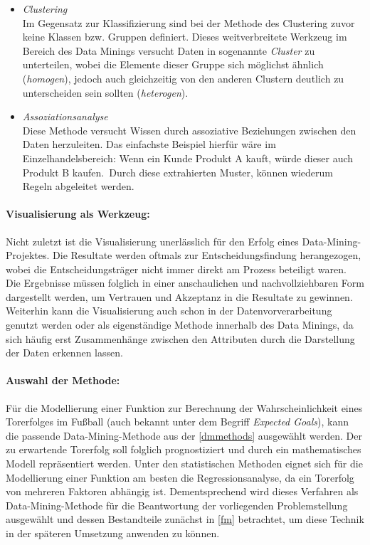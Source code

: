 \begin{itemize}
\item \textit{Clustering}
\\ Im Gegensatz zur Klassifizierung sind bei der Methode des Clustering zuvor keine Klassen bzw. Gruppen definiert. Dieses weitverbreitete Werkzeug im Bereich des Data Minings versucht Daten in sogenannte \textit{Cluster} zu unterteilen, wobei die Elemente dieser Gruppe sich möglichst ähnlich (\textit{homogen}), jedoch auch gleichzeitig von den anderen Clustern deutlich zu unterscheiden sein sollten (\textit{heterogen}).
\enlargethispage{\baselineskip} 
\item \textit{Assoziationsanalyse}
\\ Diese Methode versucht Wissen durch assoziative Beziehungen zwischen den Daten herzuleiten. Das einfachste Beispiel hierfür wäre im Einzelhandelsbereich: \glqq Wenn ein Kunde Produkt A kauft, würde dieser auch Produkt B kaufen.\grqq~Durch diese extrahierten Muster, können wiederum Regeln abgeleitet werden.
\end{itemize}


\paragraph{Visualisierung als Werkzeug:}
Nicht zuletzt ist die Visualisierung unerlässlich für den Erfolg eines Data-Mining-Projektes. Die Resultate werden oftmals zur Entscheidungsfindung herangezogen, wobei die Entscheidungsträger nicht immer direkt am Prozess beteiligt waren. Die Ergebnisse müssen folglich in einer anschaulichen und nachvollziehbaren Form dargestellt werden, um Vertrauen und Akzeptanz in die Resultate zu gewinnen. Weiterhin kann die Visualisierung auch schon in der Datenvorverarbeitung genutzt werden oder als eigenständige Methode innerhalb des Data Minings, da sich häufig erst Zusammenhänge zwischen den Attributen durch die Darstellung der Daten erkennen lassen.

\paragraph{Auswahl der Methode:}
Für die Modellierung einer Funktion zur Berechnung der Wahrscheinlichkeit eines Torerfolges im Fußball (auch bekannt unter dem Begriff \textit{Expected Goals}), kann die passende Data-Mining-Methode aus der \vref{dmmethods} ausgewählt werden. Der zu erwartende Torerfolg soll folglich prognostiziert und durch ein mathematisches Modell repräsentiert werden. Unter den statistischen Methoden eignet sich für die Modellierung einer Funktion am besten die Regressionsanalyse, da ein Torerfolg von mehreren Faktoren abhängig ist. Dementsprechend wird dieses Verfahren als Data-Mining-Methode für die Beantwortung der vorliegenden Problemstellung ausgewählt und dessen Bestandteile zunächst in \vref{fm} betrachtet, um diese Technik in der späteren Umsetzung anwenden zu können.	


